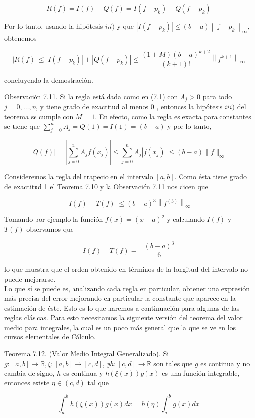 \documentclass[10pt]{article}
\begin{document}
$$
R(f)=I(f)-Q(f)=I\left(f-p_{k}\right)-Q\left(f-p_{k}\right)
$$

Por lo tanto, usando la hipótesis $i i i)$ y que $\left|I\left(f-p_{k}\right)\right| \leq(b-a)\left\|f-p_{k}\right\|_{\infty}$, obtenemos

$$
|R(f)| \leq\left|I\left(f-p_{k}\right)\right|+\left|Q\left(f-p_{k}\right)\right| \leq \frac{(1+M)(b-a)^{k+2}}{(k+1)!}\left\|f^{k+1}\right\|_{\infty}
$$

concluyendo la demostración.

Observación 7.11. Si la regla está dada como en (7.1) con $A_{j}>0$ para todo $j=0, \ldots, n$, y tiene grado de exactitud al menos 0 , entonces la hipótesis $i i i)$ del teorema se cumple con $M=1$. En efecto, como la regla es exacta para constantes se tiene que $\sum_{j=0}^{n} A_{j}=Q(1)=I(1)=(b-a)$ y por lo tanto,

$$
|Q(f)|=\left|\sum_{j=0}^{n} A_{j} f\left(x_{j}\right)\right| \leq \sum_{j=0}^{n} A_{j}\left|f\left(x_{j}\right)\right| \leq(b-a)\|f\|_{\infty}
$$

Consideremos la regla del trapecio en el intervalo $[a, b]$. Como ésta tiene grado de exactitud 1 el Teorema 7.10 y la Observación 7.11 nos dicen que

$$
|I(f)-T(f)| \leq(b-a)^{3}\left\|f^{(3)}\right\|_{\infty}
$$

Tomando por ejemplo la función $f(x)=(x-a)^{2}$ y calculando $I(f)$ y $T(f)$ observamos que

$$
I(f)-T(f)=-\frac{(b-a)^{3}}{6}
$$

lo que muestra que el orden obtenido en términos de la longitud del intervalo no puede mejorarse.\\
Lo que sí se puede es, analizando cada regla en particular, obtener una expresión más precisa del error mejorando en particular la constante que aparece en la estimación de éste. Esto es lo que haremos a continuación para algunas de las reglas clásicas. Para esto necesitamos la siguiente versión del teorema del valor medio para integrales, la cual es un poco más general que la que se ve en los cursos elementales de Cálculo.

Teorema 7.12. (Valor Medio Integral Generalizado). Si $g:[a, b] \rightarrow \mathbb{R}, \xi:[a, b] \rightarrow[c, d]$, $y h:[c, d] \rightarrow \mathbb{R}$ son tales que $g$ es continua y no cambia de signo, $h$ es continua y $h(\xi(x)) g(x)$ es una función integrable, entonces existe $\eta \in(c, d)$ tal que

$$
\int_{a}^{b} h(\xi(x)) g(x) d x=h(\eta) \int_{a}^{b} g(x) d x
$$
\end{document}
